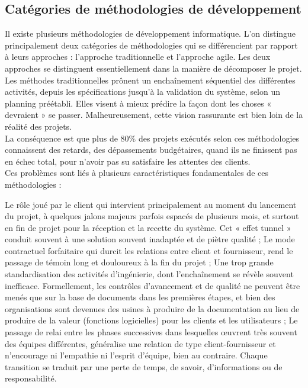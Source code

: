 \subsection{Catégories de méthodologies de développement}
Il existe plusieurs méthodologies de développement informatique. L’on distingue principalement
deux catégories de méthodologies qui se différencient par rapport à leurs approches : l’approche traditionnelle et l’approche agile. Les deux approches se distinguent essentiellement dans la manière de décomposer le projet.\\
Les méthodes traditionnelles prônent un enchaînement séquentiel des différentes activités, depuis les spécifications jusqu'à la validation du système, selon un planning préétabli. Elles visent à mieux prédire la façon dont les choses « devraient » se passer. Malheureusement, cette vision rassurante est bien loin de la réalité des projets.\\
La conséquence est que plus de 80\% des projets exécutés selon ces méthodologies connaissent des retards, des dépassements budgétaires, quand ils ne finissent pas en échec total, pour n’avoir pas su satisfaire les attentes des clients.\\
Ces problèmes sont liés à plusieurs caractéristiques fondamentales de ces méthodologies :
\begin{itemize}
	\itemtirait Le rôle joué par le client qui intervient principalement au moment du lancement du projet, à quelques jalons majeurs parfois espacés de plusieurs mois, et surtout en fin de projet pour la réception et la recette du système. Cet « effet tunnel » conduit souvent à une solution souvent inadaptée et de piètre qualité ;
	\itemtirait Le mode contractuel forfaitaire qui durcit les relations entre client et fournisseur, rend le passage de témoin long et douloureux à la fin du projet ;
	\itemtirait Une trop grande standardisation des activités d’ingénierie, dont l’enchaînement se révèle souvent inefficace. Formellement, les contrôles d'avancement et de qualité ne peuvent être menés que sur la base de documents dans les premières étapes, et bien des organisations sont devenues des usines à produire de la documentation au lieu de produire de la valeur (fonctions logicielles) pour les clients et les utilisateurs ;
	\itemtirait Le passage de relai entre les phases successives dans lesquelles œuvrent très souvent des équipes différentes, généralise une relation de type client-fournisseur et n’encourage ni l’empathie ni l’esprit d’équipe, bien au contraire. Chaque transition se traduit par une perte de temps, de savoir, d’informations ou de responsabilité.
\end{itemize}
